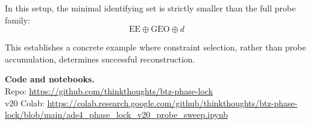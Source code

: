 \documentclass[11pt]{article}
\begin{document}
In this setup, the minimal identifying set is strictly smaller than the full probe family:
\[
\boxed{\text{EE} \oplus \text{GEO} \oplus d}
\]

This establishes a concrete example where constraint selection, rather than probe accumulation, determines successful reconstruction.

\vspace{1em}
\noindent\textbf{Code and notebooks.} \\
Repo: \url{https://github.com/thinkthoughts/btz-phase-lock} \\
v20 Colab: \url{https://colab.research.google.com/github/thinkthoughts/btz-phase-lock/blob/main/ads4_phase_lock_v20_probe_sweep.ipynb}
\end{document}
